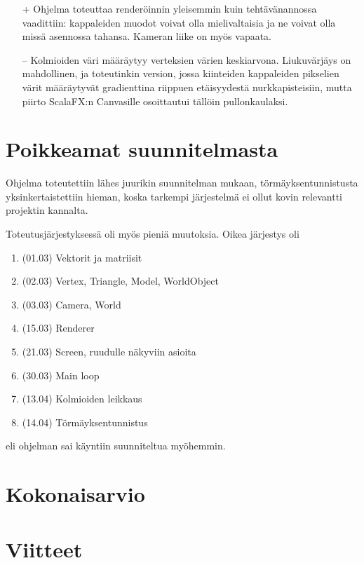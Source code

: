 \documentclass[12pt] {article}
\begin{document}
\begin{itemize}
	\item[+] Ohjelma toteuttaa renderöinnin yleisemmin kuin tehtävänannossa vaadittiin: kappaleiden muodot voivat olla mielivaltaisia ja ne voivat olla missä asennossa tahansa. Kameran liike on myös vapaata.
	\item[--] Kolmioiden väri määräytyy verteksien värien keskiarvona. Liukuvärjäys on mahdollinen, ja toteutinkin version, jossa kiinteiden kappaleiden pikselien värit määräytyvät gradienttina riippuen etäisyydestä nurkkapisteisiin, mutta piirto ScalaFX:n Canvasille osoittautui tällöin pullonkaulaksi.
\end{itemize}


\section {Poikkeamat suunnitelmasta}

Ohjelma toteutettiin lähes juurikin suunnitelman mukaan, törmäyksentunnistusta yksinkertaistettiin hieman, koska tarkempi järjestelmä ei ollut kovin relevantti projektin kannalta.

Toteutusjärjestyksessä oli myös pieniä muutoksia. Oikea järjestys oli

\begin{enumerate}
	\item (01.03) Vektorit ja matriisit
	\item (02.03) Vertex, Triangle, Model, WorldObject
	\item (03.03) Camera, World
	\item (15.03) Renderer
	\item (21.03) Screen, ruudulle näkyviin asioita
	\item (30.03) Main loop
	\item (13.04) Kolmioiden leikkaus
	\item (14.04) Törmäyksentunnistus
\end{enumerate}

eli ohjelman sai käyntiin suunniteltua myöhemmin.

\section {Kokonaisarvio}

\section {Viitteet}
\end{document}
